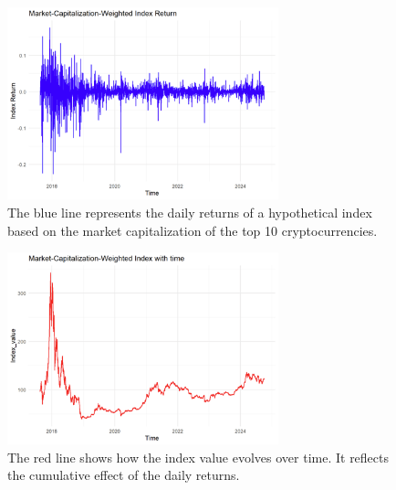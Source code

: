 \documentclass{article}
\begin{document}
\begin{figure}[h]
    \centering
    \includegraphics[width=0.7\textwidth]{4.png}
     \caption{The blue line represents the daily returns of a hypothetical index based on the market capitalization of the top 10 cryptocurrencies.}
    \label{fig:example}
\end{figure}
\begin{figure}[h]
    \centering
    \includegraphics[width=0.7\textwidth]{5.png}
     \caption{The red line shows how the index value evolves over time. It reflects the cumulative effect of the daily returns.}
    \label{fig:example}
\end{figure}
\end{document}
